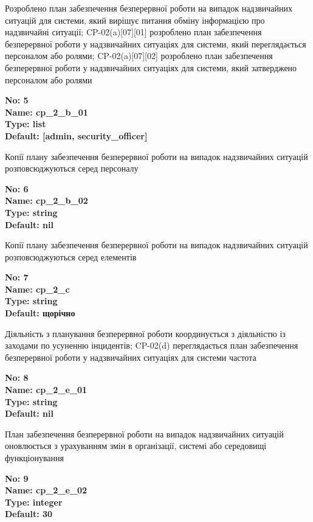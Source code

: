 \documentclass{article}
\begin{document}
{\footnotesize Розроблено план забезпечення безперервної роботи на випадок надзвичайних ситуацій для системи, який вирішує питання обміну інформацією про надзвичайні ситуації; CP-02(a)[07][01] розроблено план забезпечення безперервної роботи у надзвичайних ситуаціях для системи, який переглядається персоналом або ролями; CP-02(a)[07][02] розроблено план забезпечення безперервної роботи у надзвичайних ситуаціях для системи, який затверджено персоналом або ролями}


{\footnotesize\bfseries
No: 5\\
Name: cp\_\allowbreak{}2\_\allowbreak{}b\_\allowbreak{}01\\
Type: list\\
Default: [\textquotedbl{}admin\textquotedbl{}, \textquotedbl{}security\_\allowbreak{}officer\textquotedbl{}]
}

{\footnotesize Копії плану забезпечення безперервної роботи на випадок надзвичайних ситуацій розповсюджуються серед персоналу}


{\footnotesize\bfseries
No: 6\\
Name: cp\_\allowbreak{}2\_\allowbreak{}b\_\allowbreak{}02\\
Type: string\\
Default: nil
}

{\footnotesize Копії плану забезпечення безперервної роботи на випадок надзвичайних ситуацій розповсюджуються серед елементів}


{\footnotesize\bfseries
No: 7\\
Name: cp\_\allowbreak{}2\_\allowbreak{}c\\
Type: string\\
Default: \textquotedbl{}щорічно\textquotedbl{}
}

{\footnotesize Діяльність з планування безперервної роботи координується з діяльністю із заходами по усуненню інцидентів; CP-02(d) переглядається план забезпечення безперервної роботи у надзвичайних ситуаціях для системи частота}


{\footnotesize\bfseries
No: 8\\
Name: cp\_\allowbreak{}2\_\allowbreak{}e\_\allowbreak{}01\\
Type: string\\
Default: nil
}

{\footnotesize План забезпечення безперервної роботи на випадок надзвичайних ситуацій оновлюється з урахуванням змін в організації, системі або середовищі функціонування}


{\footnotesize\bfseries
No: 9\\
Name: cp\_\allowbreak{}2\_\allowbreak{}e\_\allowbreak{}02\\
Type: integer\\
Default: 30
}
\end{document}
